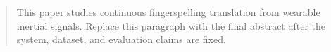 \begin{abstract}
This paper studies continuous fingerspelling translation from wearable inertial signals. Replace this paragraph with the final abstract after the system, dataset, and evaluation claims are fixed.
\end{abstract}
